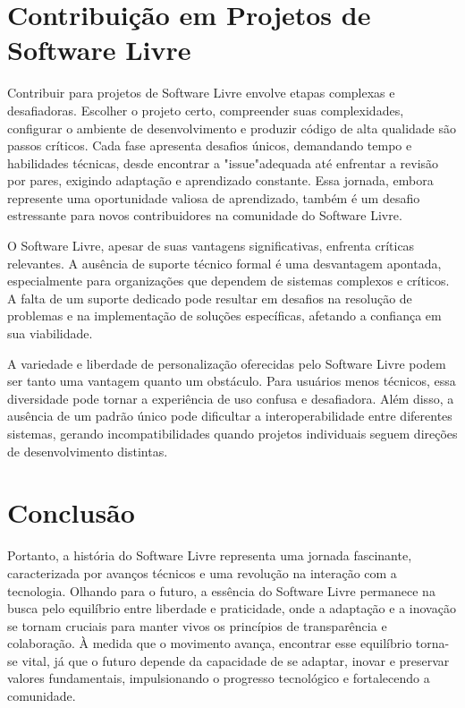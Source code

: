 \documentclass[a4paper, 12pt]{article}
\begin{document}
\section{Contribuição em Projetos de Software Livre}
Contribuir para projetos de Software Livre envolve etapas complexas e desafiadoras. Escolher o projeto certo, compreender suas complexidades, configurar o ambiente de desenvolvimento e produzir código de alta qualidade são passos críticos. Cada fase apresenta desafios únicos, demandando tempo e habilidades técnicas, desde encontrar a "issue"\space adequada até enfrentar a revisão por pares, exigindo adaptação e aprendizado constante. Essa jornada, embora represente uma oportunidade valiosa de aprendizado, também é um desafio estressante para novos contribuidores na comunidade do Software Livre.

O Software Livre, apesar de suas vantagens significativas, enfrenta críticas relevantes\cite{dado1}. A ausência de suporte técnico formal é uma desvantagem apontada, especialmente para organizações que dependem de sistemas complexos e críticos. A falta de um suporte dedicado pode resultar em desafios na resolução de problemas e na implementação de soluções específicas, afetando a confiança em sua viabilidade.

A variedade e liberdade de personalização oferecidas pelo Software Livre podem ser tanto uma vantagem quanto um obstáculo. Para usuários menos técnicos, essa diversidade pode tornar a experiência de uso confusa e desafiadora. Além disso, a ausência de um padrão único pode dificultar a interoperabilidade entre diferentes sistemas, gerando incompatibilidades quando projetos individuais seguem direções de desenvolvimento distintas.

\section{Conclusão}
Portanto, a história do Software Livre representa uma jornada fascinante, caracterizada por avanços técnicos e uma revolução na interação com a tecnologia. Olhando para o futuro, a essência do Software Livre permanece na busca pelo equilíbrio entre liberdade e praticidade, onde a adaptação e a inovação se tornam cruciais para manter vivos os princípios de transparência e colaboração. À medida que o movimento avança, encontrar esse equilíbrio torna-se vital, já que o futuro depende da capacidade de se adaptar, inovar e preservar valores fundamentais, impulsionando o progresso tecnológico e fortalecendo a comunidade.\cite{dado3}

\newpage
\printbibliography
\end{document}
